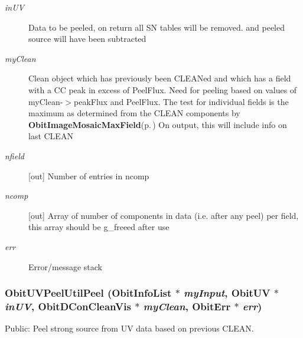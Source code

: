 \begin{Desc}
\begin{description}
\item[{\em in\-UV}]Data to be peeled, on return all SN tables will be removed. and peeled source will have been subtracted \item[{\em my\-Clean}]Clean object which has previously been CLEANed and which has a field with a CC peak in excess of Peel\-Flux. Need for peeling based on values of my\-Clean-$>$peak\-Flux and Peel\-Flux. The test for individual fields is the maximum as determined from the CLEAN components by {\bf Obit\-Image\-Mosaic\-Max\-Field}{\rm (p.\,\pageref{ObitImageMosaic_8c_a30})} On output, this will include info on last CLEAN \item[{\em nfield}][out] Number of entries in ncomp \item[{\em ncomp}][out] Array of number of components in data (i.e. after any peel) per field, this array should be g\_\-freeed after use \item[{\em err}]Error/message stack \end{description}
\end{Desc}
\subsubsection{ Obit\-UVPeel\-Util\-Peel ({\bf Obit\-Info\-List} $\ast$ {\em my\-Input}, {\bf Obit\-UV} $\ast$ {\em in\-UV}, {\bf Obit\-DCon\-Clean\-Vis} $\ast$ {\em my\-Clean}, {\bf Obit\-Err} $\ast$ {\em err})}\label{ObitUVPeelUtil_8c_a1}


Public: Peel strong source from UV data based on previous CLEAN. 

